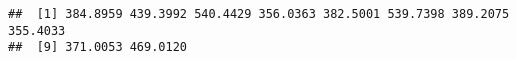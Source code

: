 \begin{knitrout}
\color{fgcolor}\begin{kframe}
\begin{alltt}
 \hlkwb{<-} 
 \hlkwb{<-} 

  \hlopt{:}
 \hlkwb{<-}     \hlstd{=} \hlstd{)}
 \hlkwb{<-} 
\hlstd{\}}


\hlstd{Tboot_b[}\hlopt{:}\hlstd{]}
\end{alltt}
\begin{verbatim}
##  [1] 384.8959 439.3992 540.4429 356.0363 382.5001 539.7398 389.2075 355.4033
##  [9] 371.0053 469.0120
\end{verbatim}
\end{kframe}
\end{knitrout}
